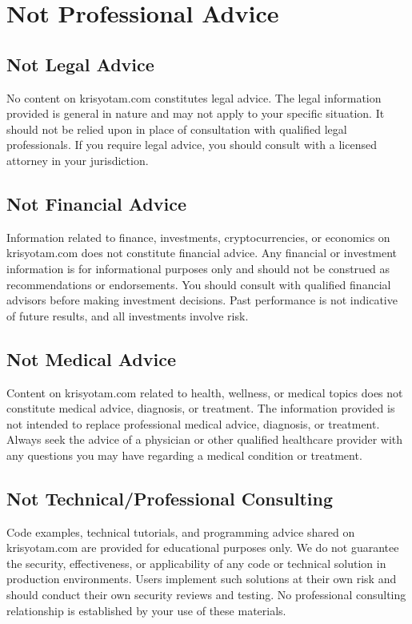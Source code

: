 \documentclass[11pt]{article}
\begin{document}
\section{Not Professional Advice}
\subsection{Not Legal Advice}
No content on krisyotam.com constitutes legal advice. The legal information provided is general in nature and may not apply to your specific situation. It should not be relied upon in place of consultation with qualified legal professionals. If you require legal advice, you should consult with a licensed attorney in your jurisdiction.

\subsection{Not Financial Advice}
Information related to finance, investments, cryptocurrencies, or economics on krisyotam.com does not constitute financial advice. Any financial or investment information is for informational purposes only and should not be construed as recommendations or endorsements. You should consult with qualified financial advisors before making investment decisions. Past performance is not indicative of future results, and all investments involve risk.

\subsection{Not Medical Advice}
Content on krisyotam.com related to health, wellness, or medical topics does not constitute medical advice, diagnosis, or treatment. The information provided is not intended to replace professional medical advice, diagnosis, or treatment. Always seek the advice of a physician or other qualified healthcare provider with any questions you may have regarding a medical condition or treatment.

\subsection{Not Technical/Professional Consulting}
Code examples, technical tutorials, and programming advice shared on krisyotam.com are provided for educational purposes only. We do not guarantee the security, effectiveness, or applicability of any code or technical solution in production environments. Users implement such solutions at their own risk and should conduct their own security reviews and testing. No professional consulting relationship is established by your use of these materials.
\end{document}
